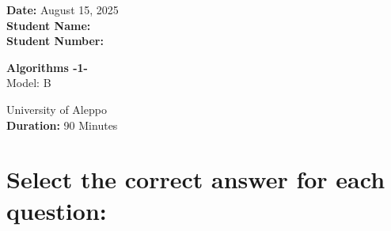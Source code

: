 \documentclass[12pt]{article}
\begin{document}
\begin{minipage}[t]{0.3\textwidth}
    \textbf{Date:} August 15, 2025\\[0.5em]
    \textbf{Student Name: }\\[0.5em]
    \textbf{Student Number: }
\end{minipage}
\begin{minipage}[t]{0.3\textwidth}
    \centering
    \Large\textbf{Algorithms -1-}\\[0.5em]
    \Large{Model:} B\\[0.5em]
\end{minipage}\hfill
\begin{minipage}[t]{0.3\textwidth}
    \raggedleft
    University of Aleppo\\[0.5em]
    \textbf{Duration: }90 Minutes

\end{minipage}

\vspace{1.5cm}

\section*{\small Select the correct answer for each question:}
\end{document}
